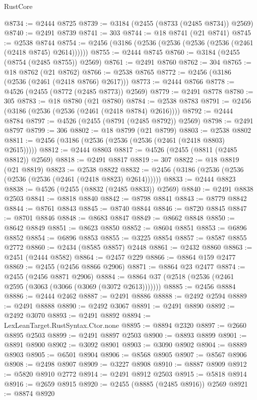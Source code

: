 \begin{lexlean}{RustCore}
\begin{coremodule}
@8734 := @2444 @8725
@8739 := @3184 (@2455 (@8733 (@2485 @8734)) @2569)
@8740 := @2491 @8739
@8741 := 303
@8744 := @18 @8741 (@21 @8741)
@8745 := @2538 @8744
@8754 := @2456 (@3186 (@2536 (@2536 (@2536 (@2536 (@2461 (@2418 @8745) @2614))))))
@8755 := @2444 @8745
@8760 := @3184 (@2455 (@8754 (@2485 @8755)) @2569)
@8761 := @2491 @8760
@8762 := 304
@8765 := @18 @8762 (@21 @8762)
@8766 := @2538 @8765
@8772 := @2456 (@3186 (@2536 (@2461 (@2418 @8766) @2617)))
@8773 := @2444 @8766
@8778 := @4526 (@2455 (@8772 (@2485 @8773)) @2569)
@8779 := @2491 @8778
@8780 := 305
@8783 := @18 @8780 (@21 @8780)
@8784 := @2538 @8783
@8791 := @2456 (@3186 (@2536 (@2536 (@2461 (@2418 @8784) @2616))))
@8792 := @2444 @8784
@8797 := @4526 (@2455 (@8791 (@2485 @8792)) @2569)
@8798 := @2491 @8797
@8799 := 306
@8802 := @18 @8799 (@21 @8799)
@8803 := @2538 @8802
@8811 := @2456 (@3186 (@2536 (@2536 (@2536 (@2461 (@2418 @8803) @2615)))))
@8812 := @2444 @8803
@8817 := @4526 (@2455 (@8811 (@2485 @8812)) @2569)
@8818 := @2491 @8817
@8819 := 307
@8822 := @18 @8819 (@21 @8819)
@8823 := @2538 @8822
@8832 := @2456 (@3186 (@2536 (@2536 (@2536 (@2536 (@2461 (@2418 @8823) @2614))))))
@8833 := @2444 @8823
@8838 := @4526 (@2455 (@8832 (@2485 @8833)) @2569)
@8840 := @2491 @8838 @2503
@8841 := @8818 @8840
@8842 := @8798 @8841
@8843 := @8779 @8842
@8844 := @8761 @8843
@8845 := @8740 @8844
@8846 := @8720 @8845
@8847 := @8701 @8846
@8848 := @8683 @8847
@8849 := @8662 @8848
@8850 := @8642 @8849
@8851 := @8623 @8850
@8852 := @8604 @8851
@8853 := @6896 @8852
@8854 := @6896 @8853
@8855 := @3225 @8854
@8857 := @8587 @8855 @2772
@8860 := @2434 (@8585 @8857) @2448
@8861 := @2432 @8860
@8863 := @2451 (@2444 @8582)
@8864 := @2457 @229
@8866 := @8864 @159 @2477
@8869 := @2455 (@2456 @8866 @2906)
@8871 := @8864 @23 @2477
@8874 := @2455 (@2456 @8871 @2906)
@8884 := @8864 @37 (@2518 (@2536 (@2461 @2595 (@3063 (@3066 (@3069 (@3072 @2613)))))))
@8885 := @2456 @8884
@8886 := @2444 @2462
@8887 := @2491 @8886
@8888 := @2492 @2594
@8889 := @2491 @8888
@8890 := @2492 @3067
@8891 := @2491 @8890
@8892 := @2492 @3070
@8893 := @2491 @8892
@8894 := LexLeanTarget.RustSyntax.Ctor.none
@8895 := @8894 @2320
@8897 := @2660 @8895 @2503
@8899 := @2491 @8897 @2503
@8900 := @8893 @8899
@8901 := @8891 @8900
@8902 := @3092 @8901
@8903 := @3090 @8902
@8904 := @8889 @8903
@8905 := @6501 @8904
@8906 := @8568 @8905
@8907 := @8567 @8906
@8908 := @2498 @8907
@8909 := @3227 @8908
@8910 := @8887 @8909
@8912 := @5820 @8910 @2772
@8914 := @2491 @8912 @2503
@8915 := @5818 @8914
@8916 := @2659 @8915
@8920 := @2455 (@8885 (@2485 @8916)) @2569
@8921 := @8874 @8920

\end{coremodule}
\end{lexlean}
